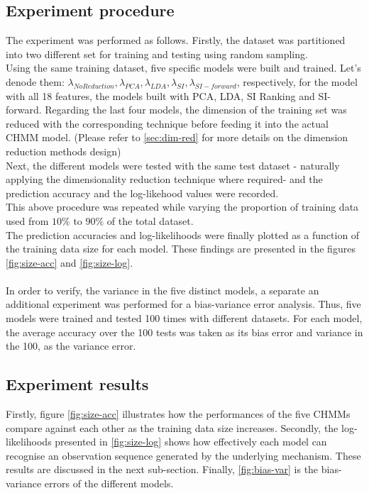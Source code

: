 \subsection{Experiment procedure}
The experiment was performed as follows.
Firstly, the dataset was partitioned into two different set for training and testing using random sampling.\\
Using the same training dataset, five specific models were built and trained. Let's denode them: \(\lambda_{No Reduction}, \lambda_{PCA}, \lambda_{LDA}, \lambda_{SI}, \lambda_{SI-forward}\), respectively, for the model with all 18 features, the models built with PCA, LDA, SI Ranking and SI-forward. Regarding the last four models, the dimension of the training set was reduced with the corresponding technique before feeding it into the actual CHMM model. (Please refer to \ref{sec:dim-red} for more details on the dimension reduction methods design)\\
Next, the different models were tested with the same test dataset - naturally applying the dimensionality reduction technique where required- and the prediction accuracy and the log-likehood values were recorded.\\
This above procedure was repeated while varying the proportion of training data used from \(10\%\) to \(90\%\) of the total dataset.\\
The prediction accuracies and log-likelihoods were finally plotted as a function of the training data size for each model.
These findings are presented in the figures \ref{fig:size-acc} and \ref{fig:size-log}. \\\\
In order to verify, the variance in the five distinct models, a separate an additional experiment was performed for a bias-variance error analysis. Thus, five models were trained and tested 100 times with different datasets. For each model, the average accuracy over the 100 tests was taken as its bias error and variance in the 100, as the variance error.

\subsection{Experiment results}
Firstly, figure \ref{fig:size-acc} illustrates how the performances of the five CHMMs compare against each other as the training data size increases.
Secondly, the log-likelihoods presented in \ref{fig:size-log} shows how effectively each model can recognise an observation sequence generated by the underlying mechanism. These results are discussed in the next sub-section.
Finally, \ref{fig:bias-var} is the bias-variance errors of the different models.

